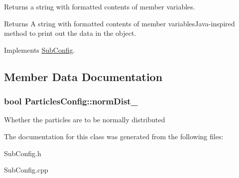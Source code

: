 Returns a string with formatted contents of member variables. 

\begin{DoxyReturn}{Returns}
A string with formatted contents of member variables\+Java-\/inspired method to print out the data in the object. 
\end{DoxyReturn}


Implements \hyperlink{classSubConfig_aaaef674182db54e8d13eec1456e1ab5b}{Sub\+Config}.



\subsection{Member Data Documentation}
\hypertarget{classParticlesConfig_a414f45bab84f23499f8105f8c200db21}{
\subsubsection[{norm\+Dist\+\_\+}]{\setlength{\rightskip}{0pt plus 5cm}bool Particles\+Config\+::norm\+Dist\+\_\+\hspace{0.3cm}{\ttfamily [protected]}}}\label{classParticlesConfig_a414f45bab84f23499f8105f8c200db21}
Whether the particles are to be normally distributed 

The documentation for this class was generated from the following files\+:\begin{DoxyCompactItemize}
\item 
Sub\+Config.\+h\item 
Sub\+Config.\+cpp\end{DoxyCompactItemize}
